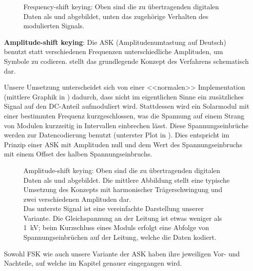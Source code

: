 \begin{figure}[h!tb]
    \centering
    
    \caption[Frequency-Shift keying]{%
        Frequency-shift  keying: Oben sind  die  zu \"ubertragenden  digitalen
        Daten  als   und   abgebildet, unten  das zugeh\"orige
        Verhalten des modulierten Signals.%
    }
    \label{fig:fsk:concept}
\end{figure}


\textbf{Amplitude-shift  keying}: Die  ASK (Amplitudenumtastung  auf  Deutsch)
benutzt statt verschiedenen Frequenzen unterschiedliche Amplituden, um Symbole
zu  codieren.    stellt  das  grundlegende  Konzept  des
Verfahrens schematisch dar.

Unsere  Umsetzung unterscheidet  sich  von  einer <<normalen>>   Implementation
(mittlere   Graphik  in   )  dadurch,   dass  nicht   im
eigentlichen Sinne  ein zus\"atzliches  Signal auf den  DC-Anteil aufmoduliert
wird. Stattdessen   wird  ein   Solarmodul  mit   einer  bestimmten   Frequenz
kurzgeschlossen,  was die  Spannung auf  einem Strang  von Modulen  kurzzeitig
in  Intervallen  einbrechen  l\"asst. Diese  Spannungseinbr\"uche  werden  zur
Datencodierung  benutzt   (unterster  Plot   in  ). Dies
entspricht  im  Prinzip  einer  ASK  mit Amplituden  null  und  dem  Wert  des
Spannungseinbruchs mit einem Offset des halben Spannungseinbruchs.


\begin{figure}[h!tb]
    \centering
    
    \caption[Amplitude-shift keying]{%
        Amplitude-shift  keying: Oben   sind  die   zu  \"ubertragenden
        digitalen  Daten als   und   abgebildet. Die  mittlere
        Abbildung stellt eine typische Umsetzung des Konzepts mit harmonischer
        Tr\"agerschwingung und zwei verschiedenen Amplituden dar.\protect\\
        Das  unterste   Signal  ist  eine  vereinfachte   Darstellung  unserer
        Variante.  Die  Gleichspannung an  der Leitung  ist etwas  weniger als
        \SI{1}{\kilo\volt}; beim Kurzschluss eines Moduls erfolgt eine Abfolge
        von Spannungseinbr\"uchen auf der Leitung, welche die Daten kodiert.%
    }
    \label{fig:ask:concept}
\end{figure}


Sowohl  FSK wie  auch  unsere  Variante der  ASK  haben  ihre jeweiligen  Vor-
und  Nachteile,  auf  welche im  Kapitel  \emph{}  genauer
eingegangen wird.
